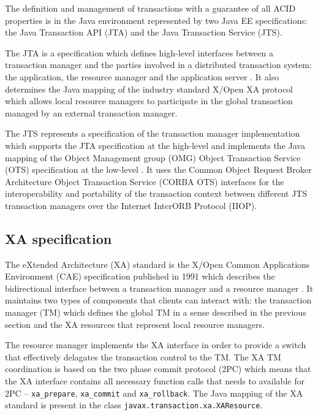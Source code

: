 \documentclass[oneside,
  digital, %
  table,   %
  nolof,     %
  nolot,     %
]{fithesis3}
\begin{document}
The definition and management of transactions with a guarantee of all ACID properties is in the Java environment represented by two Java EE specifications: the Java Transaction API (JTA) and the Java Transaction Service (JTS). 

The JTA is a specification which defines high-level interfaces between a transaction manager and the parties involved in a distributed transaction system: the application, the resource manager and the application server \cite{jta}. It also determines the Java mapping of the industry standard X/Open XA protocol which allows local resource managers to participate in the global transaction managed by an external transaction manager.

The JTS represents a specification of the transaction manager implementation which supports the JTA specification at the high-level and implements the Java mapping of the Object Management group (OMG) Object Transaction Service (OTS) specification at the low-level \cite{jts}. It uses the Common Object Request Broker Architecture Object Transaction Service (CORBA OTS) interfaces for the interoperability and portability of the transaction context between different JTS transaction managers over the Internet InterORB Protocol (IIOP).

\subsection{XA specification}

The eXtended Architecture (XA) standard is the X/Open Common Applications Environment (CAE) specification published in 1991 which describes the bidirectional interface between a transaction manager and a resource manager \cite{xa_spec}. It maintains two types of components that clients can interact with: the transaction manager (TM) which defines the global TM in a sense described in the previous section and the XA resources that represent local resource managers.

The resource manager implements the XA interface in order to provide a switch that effectively delagates the transaction control to the TM. The XA TM coordination is based on the two phase commit protocol (2PC) which means that the XA interface contains all necessary function calls that needs to available for 2PC -- \texttt{xa\_prepare}, \texttt{xa\_commit} and \texttt{xa\_rollback}. The Java mapping of the XA standard is present in the class \texttt{javax.transaction.xa.XAResource}.
\end{document}

